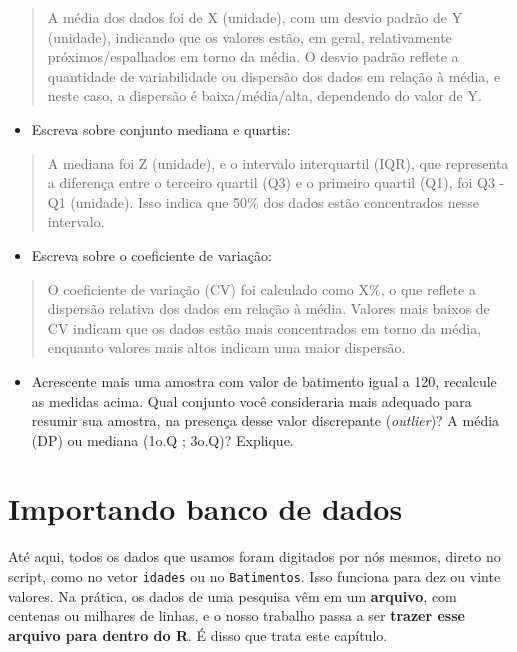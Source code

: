 \documentclass[
]{book}
\providecommand{\tightlist}{%
  \setlength{\itemsep}{0pt}\setlength{\parskip}{0pt}}
\begin{document}
\begin{quote}
A média dos dados foi de X (unidade), com um desvio padrão de Y (unidade), indicando que os valores estão, em geral, relativamente próximos/espalhados em torno da média. O desvio padrão reflete a quantidade de variabilidade ou dispersão dos dados em relação à média, e neste caso, a dispersão é baixa/média/alta, dependendo do valor de Y.
\end{quote}

\begin{itemize}
\tightlist
\item
  Escreva sobre conjunto mediana e quartis:
\end{itemize}

\begin{quote}
A mediana foi Z (unidade), e o intervalo interquartil (IQR), que representa a diferença entre o terceiro quartil (Q3) e o primeiro quartil (Q1), foi Q3 - Q1 (unidade). Isso indica que 50\% dos dados estão concentrados nesse intervalo.
\end{quote}

\begin{itemize}
\tightlist
\item
  Escreva sobre o coeficiente de variação:
\end{itemize}

\begin{quote}
O coeficiente de variação (CV) foi calculado como X\%, o que reflete a dispersão relativa dos dados em relação à média. Valores mais baixos de CV indicam que os dados estão mais concentrados em torno da média, enquanto valores mais altos indicam uma maior dispersão.
\end{quote}

\begin{itemize}
\tightlist
\item
  Acrescente mais uma amostra com valor de batimento igual a 120, recalcule as medidas acima. Qual conjunto você consideraria mais adequado para resumir sua amostra, na presença desse valor discrepante (\emph{outlier})? A média (DP) ou mediana (1o.Q ; 3o.Q)? Explique.
\end{itemize}

\chapter{Importando banco de dados}\label{importando-banco-de-dados}

Até aqui, todos os dados que usamos foram digitados por nós mesmos, direto no script, como no vetor \texttt{idades} ou no \texttt{Batimentos}. Isso funciona para dez ou vinte valores. Na prática, os dados de uma pesquisa vêm em um \textbf{arquivo}, com centenas ou milhares de linhas, e o nosso trabalho passa a ser \textbf{trazer esse arquivo para dentro do R}. É disso que trata este capítulo.
\end{document}
